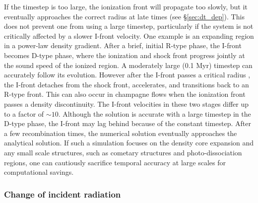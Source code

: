 \documentclass[useAMS,usenatbib,a4paper]{mn2e}
\begin{document}
If the timestep is too large, the ionization front will propagate too
slowly, but it eventually approaches the correct radius at late times
(see \S\ref{sec:dt_dep}).  This does not prevent one from using a
large timestep, particularly if the system is not critically affected
by a slower I-front velocity.  One example is an expanding \hii
region in a power-law density gradient.  After a brief, initial R-type
phase, the I-front becomes D-type phase, where the ionization and
shock front progress jointly at the sound speed of the ionized region.
A moderately large (0.1 Myr) timestep can accurately follow its
evolution.  However after the I-front passes a critical radius
\citep{Franco90}, the I-front detaches from the shock front,
accelerates, and transitions back to an R-type front.  This can also
occur in champagne flows when the ionization front passes a density
discontinuity.  The I-front velocities in these two stages differ up
to a factor of $\sim10$.  Although the solution is accurate with a
large timestep in the D-type phase, the I-front may lag behind because
of the constant timestep.  After a few recombination times, the
numerical solution eventually approaches the analytical solution.  If
such a simulation focuses on the density core expansion and any small
scale structures, such as cometary structures and photo-dissociation
regions, one can cautiously sacrifice temporal accuracy at large
scales for computational savings.

\subsubsection{Change of incident radiation}
\label{sec:dt_tau}
\end{document}
